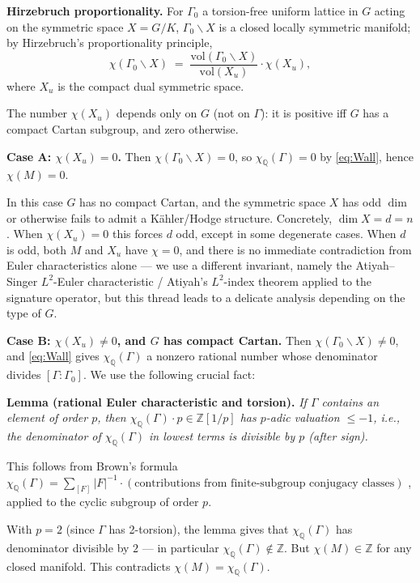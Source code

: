 \textbf{Hirzebruch proportionality.}  For $\Gamma_0$ a torsion-free uniform lattice in $G$ acting on the symmetric space $X=G/K$, $\Gamma_0\backslash X$ is a closed locally symmetric manifold; by Hirzebruch's proportionality principle,
\begin{equation}\label{eq:Hirz}
\chi(\Gamma_0\backslash X)\;=\;\frac{\mathrm{vol}(\Gamma_0\backslash X)}{\mathrm{vol}(X_u)}\cdot\chi(X_u),
\end{equation}
where $X_u$ is the compact dual symmetric space.

The number $\chi(X_u)$ depends only on $G$ (not on $\Gamma$): it is positive iff $G$ has a compact Cartan subgroup, and zero otherwise.

\medskip
\noindent\textbf{Case A: $\chi(X_u)=0$.}  Then $\chi(\Gamma_0\backslash X)=0$, so $\chi_{\mathbb Q}(\Gamma)=0$ by \eqref{eq:Wall}, hence $\chi(M)=0$.

In this case $G$ has no compact Cartan, and the symmetric space $X$ has odd $\dim$ or otherwise fails to admit a Kähler/Hodge structure.  Concretely, $\dim X = d = n$.  When $\chi(X_u)=0$ this forces $d$ odd, except in some degenerate cases.  When $d$ is odd, both $M$ and $X_u$ have $\chi=0$, and there is no immediate contradiction from Euler characteristics alone — we use a different invariant, namely the Atiyah--Singer $L^2$-Euler characteristic / Atiyah's $L^2$-index theorem applied to the signature operator, but this thread leads to a delicate analysis depending on the type of $G$.

\medskip
\noindent\textbf{Case B: $\chi(X_u)\ne 0$, and $G$ has compact Cartan.}  Then $\chi(\Gamma_0\backslash X)\ne 0$, and \eqref{eq:Wall} gives $\chi_{\mathbb Q}(\Gamma)$ a nonzero rational number whose denominator divides $[\Gamma:\Gamma_0]$.  We use the following crucial fact:

\medskip
\noindent\textbf{Lemma (rational Euler characteristic and torsion).}  \emph{If $\Gamma$ contains an element of order $p$, then $\chi_{\mathbb Q}(\Gamma)\cdot p\in\mathbb Z[1/p]$ has $p$-adic valuation $\le -1$, i.e., the denominator of $\chi_{\mathbb Q}(\Gamma)$ in lowest terms is divisible by $p$ (after sign).}

This follows from Brown's formula $\chi_{\mathbb Q}(\Gamma)=\sum_{[F]}|F|^{-1}\cdot(\text{contributions from finite-subgroup conjugacy classes})$ \cite[Ch.\ IX, Thm 9.3]{Brown}, applied to the cyclic subgroup of order $p$.

\medskip
With $p=2$ (since $\Gamma$ has 2-torsion), the lemma gives that $\chi_{\mathbb Q}(\Gamma)$ has denominator divisible by $2$ — in particular $\chi_{\mathbb Q}(\Gamma)\notin\mathbb Z$.  But $\chi(M)\in\mathbb Z$ for any closed manifold.  This contradicts $\chi(M)=\chi_{\mathbb Q}(\Gamma)$.


